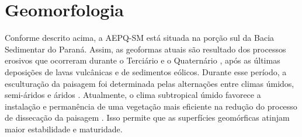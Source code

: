 \section{Geomorfologia}

Conforme descrito acima, a AEPQ-SM está situada na porção sul da Bacia Sedimentar do Paraná. Assim, as geoformas atuais são resultado dos processos erosivos que ocorreram durante o Terciário e o Quaternário \cite{Sartori2009}, após as últimas deposições de lavas vulcânicas e de sedimentos eólicos. Durante esse período, a esculturação da paisagem foi determinada pelas alternações entre climas úmidos, semi-áridos e áridos \cite{Sartori2009}. Atualmente, o clima subtropical úmido favorece a instalação e permanência de uma vegetação mais eficiente na redução do processo de dissecação da paisagem \cite{Sartori2009, NascimentoEtAl2010}. Isso permite que as superfícies geomórficas atinjam maior estabilidade e maturidade.



